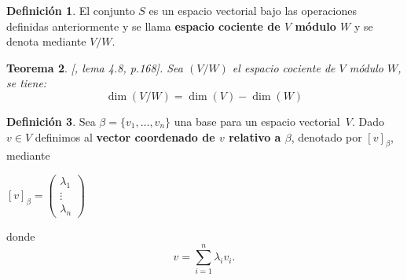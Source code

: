 \documentclass[12pt]{book}
\newtheorem{theorem}{Teorema}[section]
\theoremstyle{definition}
\newtheorem{definition}[theorem]{Definición}
\newcounter{in}
\newcounter{ini}
\begin{document}
\begin{definition}
  El conjunto $S$ es un espacio vectorial bajo las operaciones
  definidas anteriormente y se llama \textbf{espacio cociente de $V$ módulo $W$} y se denota mediante $V/W$. 
\end{definition}

\begin{theorem}{[\cite{herstein1990algebra}, lema 4.8, p.168]}.
  \label{dim-esp-coc}
  Sea $(V/W)$ el espacio cociente de $V$ módulo $W$, se tiene:
  $$\dim(V/W)=\dim(V)-\dim(W)$$
\end{theorem}



\begin{definition}
  \label{vec-coor}
  Sea $\beta=\{v_{1},\ldots,v_{n}\}$ una base para un espacio
  vectorial~$V$. Dado $v\in V$ definimos al \textbf{vector coordenado de $v$
  relativo a $\beta$}, denotado por $[v]_{\beta}$, mediante
  \begin{center}
    $[v]_{\beta}=\begin{pmatrix}
      \lambda_{1}  \\
      \vdots  \\
      \lambda_{n}  
    \end{pmatrix}$
  \end{center}
donde
\begin{equation*}
  v=\sum^{n}_{i=1}\lambda_{i}v_{i}.
\end{equation*}
\end{definition}
\end{document}
